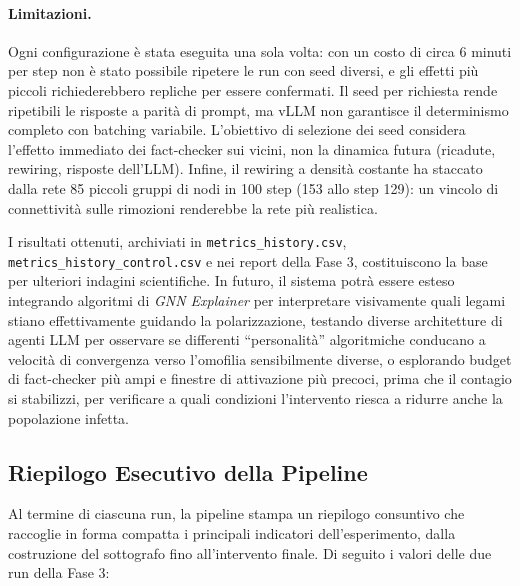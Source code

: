 \documentclass[11pt, a4paper]{article}
\begin{document}
\paragraph{Limitazioni.} Ogni configurazione è stata eseguita una sola volta: con un costo di circa 6 minuti per step non è stato possibile ripetere le run con seed diversi, e gli effetti più piccoli richiederebbero repliche per essere confermati. Il seed per richiesta rende ripetibili le risposte a parità di prompt, ma vLLM non garantisce il determinismo completo con batching variabile. L'obiettivo di selezione dei seed considera l'effetto immediato dei fact-checker sui vicini, non la dinamica futura (ricadute, rewiring, risposte dell'LLM). Infine, il rewiring a densità costante ha staccato dalla rete 85 piccoli gruppi di nodi in 100 step (153 allo step 129): un vincolo di connettività sulle rimozioni renderebbe la rete più realistica.

I risultati ottenuti, archiviati in \texttt{metrics\_history.csv}, \texttt{metrics\_history\_control.csv} e nei report della Fase 3, costituiscono la base per ulteriori indagini scientifiche. In futuro, il sistema potrà essere esteso integrando algoritmi di \textit{GNN Explainer} per interpretare visivamente quali legami stiano effettivamente guidando la polarizzazione, testando diverse architetture di agenti LLM per osservare se differenti ``personalità'' algoritmiche conducano a velocità di convergenza verso l'omofilia sensibilmente diverse, o esplorando budget di fact-checker più ampi e finestre di attivazione più precoci, prima che il contagio si stabilizzi, per verificare a quali condizioni l'intervento riesca a ridurre anche la popolazione infetta.

\subsection{Riepilogo Esecutivo della Pipeline}
Al termine di ciascuna run, la pipeline stampa un riepilogo consuntivo che raccoglie in forma compatta i principali indicatori dell'esperimento, dalla costruzione del sottografo fino all'intervento finale. Di seguito i valori delle due run della Fase 3:
\end{document}
